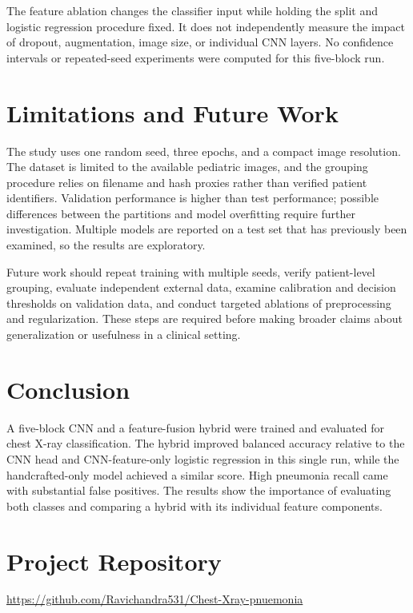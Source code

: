 \documentclass[conference]{IEEEtran}
\begin{document}
The feature ablation changes the classifier input while holding the split and logistic regression procedure fixed. It does not independently measure the impact of dropout, augmentation, image size, or individual CNN layers. No confidence intervals or repeated-seed experiments were computed for this five-block run.

\section{Limitations and Future Work}
The study uses one random seed, three epochs, and a compact image resolution. The dataset is limited to the available pediatric images, and the grouping procedure relies on filename and hash proxies rather than verified patient identifiers. Validation performance is higher than test performance; possible differences between the partitions and model overfitting require further investigation. Multiple models are reported on a test set that has previously been examined, so the results are exploratory.

Future work should repeat training with multiple seeds, verify patient-level grouping, evaluate independent external data, examine calibration and decision thresholds on validation data, and conduct targeted ablations of preprocessing and regularization. These steps are required before making broader claims about generalization or usefulness in a clinical setting.

\section{Conclusion}
A five-block CNN and a feature-fusion hybrid were trained and evaluated for chest X-ray classification. The hybrid improved balanced accuracy relative to the CNN head and CNN-feature-only logistic regression in this single run, while the handcrafted-only model achieved a similar score. High pneumonia recall came with substantial false positives. The results show the importance of evaluating both classes and comparing a hybrid with its individual feature components.

\section{Project Repository}
\url{https://github.com/Ravichandra531/Chest-Xray-pnuemonia}
\end{document}

